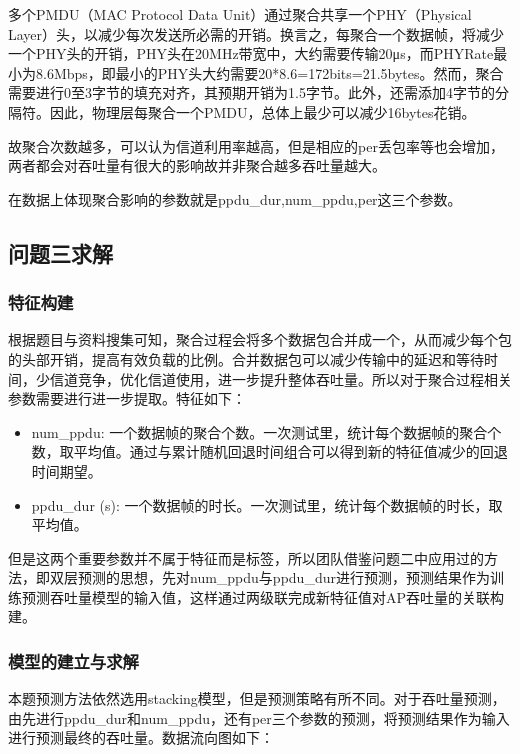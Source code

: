 多个PMDU（MAC Protocol Data Unit）通过聚合共享一个PHY（Physical Layer）头，以减少每次发送所必需的开销。换言之，每聚合一个数据帧，将减少一个PHY头的开销，PHY头在20MHz带宽中，大约需要传输20μs，而PHYRate最小为8.6Mbps，即最小的PHY头大约需要20*8.6=172bits=21.5bytes。然而，聚合需要进行0至3字节的填充对齐，其预期开销为1.5字节。此外，还需添加4字节的分隔符。因此，物理层每聚合一个PMDU，总体上最少可以减少16bytes花销。

故聚合次数越多，可以认为信道利用率越高，但是相应的per丢包率等也会增加，两者都会对吞吐量有很大的影响故并非聚合越多吞吐量越大。

在数据上体现聚合影响的参数就是ppdu\_dur,num\_ppdu,per这三个参数。

\subsection{问题三求解}
\subsubsection{特征构建}

根据题目与资料搜集可知，聚合过程会将多个数据包合并成一个，从而减少每个包的头部开销，提高有效负载的比例。合并数据包可以减少传输中的延迟和等待时间，少信道竞争，优化信道使用，进一步提升整体吞吐量。所以对于聚合过程相关参数需要进行进一步提取。特征如下：

\begin{itemize}
	\item num\_ppdu: 一个数据帧的聚合个数。一次测试里，统计每个数据帧的聚合个数，取平均值。通过与累计随机回退时间组合可以得到新的特征值减少的回退时间期望。
	\item ppdu\_dur (s): 一个数据帧的时长。一次测试里，统计每个数据帧的时长，取平均值。
\end{itemize}

但是这两个重要参数并不属于特征而是标签，所以团队借鉴问题二中应用过的方法，即双层预测的思想，先对num\_ppdu与ppdu\_dur进行预测，预测结果作为训练预测吞吐量模型的输入值，这样通过两级联完成新特征值对AP吞吐量的关联构建。

\subsubsection{模型的建立与求解}


本题预测方法依然选用stacking模型，但是预测策略有所不同。对于吞吐量预测，由先进行ppdu\_dur和num\_ppdu，还有per三个参数的预测，将预测结果作为输入进行预测最终的吞吐量。数据流向图如下：


